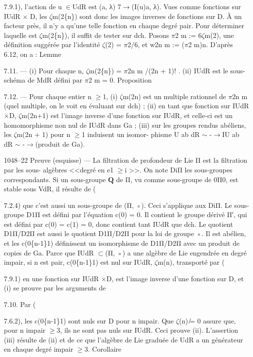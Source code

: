 \documentclass[11pt]{article}
\begin{document}
7.9.1), l’action de u \(\in\)UdR est (a, λ) 7\(\to\)(I(u)a, λ). Vues comme fonctions sur IUdR × D, les \(\zeta\)m(2\{n\}) sont donc les images inverses de fonctions sur D. À un facteur près, il n’y a qu’une telle fonction en chaque degré pair. Pour déterminer laquelle est \(\zeta\)m(2\{n\}), il suffit de tester sur dch. Posons \(\pi\)2 m := 6\(\zeta\)m(2), une définition suggérée par l’identité \(\zeta\)(2) = \(\pi\)2/6, et w2n m := (\(\pi\)2 m)n. D’après 6.12, on a : Lemme 

7.11. --- (i) Pour chaque n, \(\zeta\)m(2\{n\}) = \(\pi\)2n m /(2n + 1)! . (ii) IUdR est le sous-schéma de MdR défini par \(\pi\)2 m = 0. Proposition 

7.12. --- Pour chaque entier n \(\ge\)1, (i) \(\zeta\)m(2n) est un multiple rationnel de \(\pi\)2n m (quel multiple, on le voit en évaluant sur dch) ; (ii) en tant que fonction sur IUdR ×D, \(\zeta\)m(2n+1) est l’image inverse d’une fonction sur IUdR, et celle-ci est un homomorphisme non nul de IUdR dans Ga ; (iii) sur les groupes rendus abéliens, les \(\zeta\)m(2n + 1) pour n \(\ge\)1 induisent un isomor- phisme U ab dR \(\sim\) -\(\to\)IU ab dR \(\sim\) -\(\to\)(produit de Ga).

1048--22 Preuve (esquisse) --- La filtration de profondeur de Lie Π est la filtration par les sous- algèbres <<degré en e1 \(\ge\)i >>. On note DiΠ les sous-groupes correspondants. Si un sous-groupe \(\mathbf Q\) de Π, vu comme sous-groupe de 0Π0, est stable sous VdR, il résulte de (

7.2.4) que c’est aussi un sous-groupe de (Π, ◦). Ceci s’applique aux DiΠ. Le sous-groupe D1Π est défini par l’équation c(0) = 0. Il contient le groupe dérivé Π′, qui est défini par c(0) = c(1) = 0, donc contient tant IUdR que dch. Le quotient D1Π/D2Π est aussi le quotient D1Π/D2Π pour la loi de groupe ◦. Il est abélien, et les c(0\{n-1\}1) définissent un isomorphisme de D1Π/D2Π avec un produit de copies de Ga. Parce que IUdR \(\subset\)(Π, ◦) a une algèbre de Lie engendrée en degré impair, si n est pair, c(0\{n-1\}1) est nul sur IUdR, \(\zeta\)m(n), transporté par (

7.9.1) en une fonction sur IUdR ×D, est l’image inverse d’une fonction sur D, et (i) se prouve par les arguments de 

7.10. Par (

7.6.2), les c(0\{n-1\}1) sont nuls sur D pour n impair. Que \(\zeta\)(n) ̸= 0 assure que, pour n impair \(\ge\)3, ils ne sont pas nuls sur IUdR. Ceci prouve (ii). L’assertion (iii) résulte de (ii) et de ce que l’algèbre de Lie graduée de UdR a un générateur en chaque degré impair \(\ge\)3. Corollaire 
\end{document}
